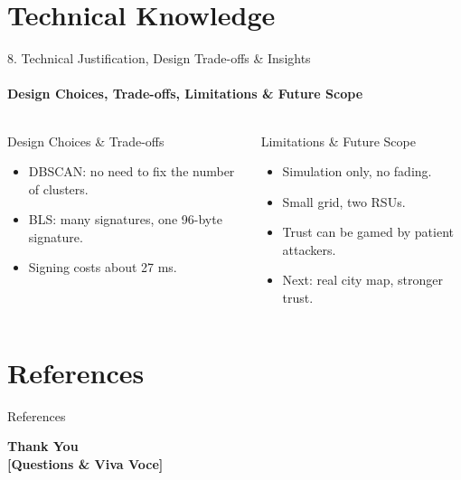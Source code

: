 \documentclass[aspectratio=169, 11pt]{beamer}
\begin{document}
\section{Technical Knowledge}

\begin{frame}{8. Technical Justification, Design Trade-offs \& Insights}
    \framesubtitle{Design Choices, Trade-offs, Limitations \& Future Scope}
    \begin{columns}[T]
        \begin{block}{Design Choices \& Trade-offs}
            \begin{itemize}
                \item DBSCAN: no need to fix the number of clusters.
                \item BLS: many signatures, one 96-byte signature.
                \item Signing costs about 27 ms.
            \end{itemize}
        \end{block}

        \begin{block}{Limitations \& Future Scope}
            \begin{itemize}
                \item Simulation only, no fading.
                \item Small grid, two RSUs.
                \item Trust can be gamed by patient attackers.
                \item Next: real city map, stronger trust.
            \end{itemize}
        \end{block}
    \end{columns}
\end{frame}

\section{References}
\nocite{wisitpongphan2007,kaur2024,azizi2024,naskar2025,chen2024,lopez2018}
\begin{frame}[allowframebreaks]{References}
    \footnotesize
    
    
\end{frame}

\begin{frame}
    \centering
    {\Huge \textbf{\textcolor{amritaMaroon}{Thank You}}} \\[0.4cm]
    {\large \textbf{[Questions \& Viva Voce]}}
\end{frame}
\end{document}
